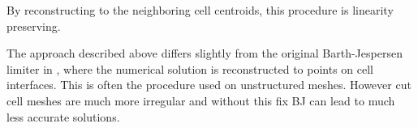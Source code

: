 By reconstructing to the neighboring cell centroids, this procedure is linearity preserving.  

The approach described above differs slightly from the original Barth-Jespersen limiter in
\cite{barth-jespersen}, where the numerical solution is reconstructed to 
points on cell interfaces.
This is often the procedure used on unstructured meshes. However cut cell meshes are much more
irregular and without this fix BJ can lead to much less accurate solutions.

